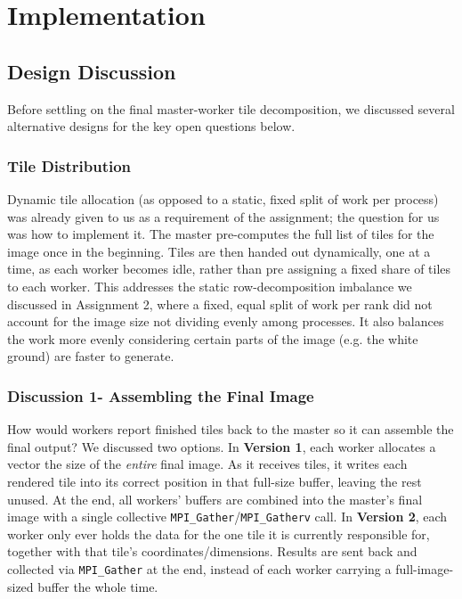 \chapter{Implementation}

\section{Design Discussion}

Before settling on the final master-worker tile decomposition, we discussed several alternative designs for the key open questions below.

\subsection{Tile Distribution}

Dynamic tile allocation (as opposed to a static, fixed split of work per process) was already given to us as a requirement of the assignment; the question for us was how to implement it. The master pre-computes the full list of tiles for the image once in the beginning. Tiles are then handed out dynamically, one at a time, as each worker becomes idle, rather than pre assigning a fixed share of tiles to each worker. This addresses the static row-decomposition imbalance we discussed in Assignment 2, where a fixed, equal split of work per rank did not account for the image size not dividing evenly among processes. It also balances the work more evenly considering certain parts of the image (e.g. the white ground) are faster to generate.

\subsection{Discussion 1- Assembling the Final Image}

How would workers report finished tiles back to the master so it can assemble the final output? We discussed two options. In \textbf{Version 1}, each worker allocates a vector the size of the \emph{entire} final image. As it receives tiles, it writes each rendered tile into its correct position in that full-size buffer, leaving the rest unused. At the end, all workers' buffers are combined into the master's final image with a single collective \texttt{MPI\_Gather}/\texttt{MPI\_Gatherv} call. In \textbf{Version 2}, each worker only ever holds the data for the one tile it is currently responsible for, together with that tile's coordinates/dimensions. Results are sent back and collected via \texttt{MPI\_Gather} at the end, instead of each worker carrying a full-image-sized buffer the whole time.

